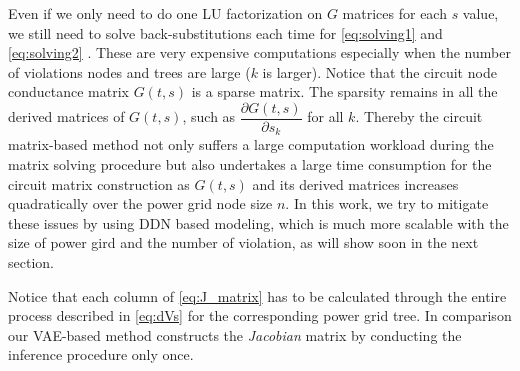 Even if we only need to do one LU factorization on $G$ matrices for each $s$ value, we still need to solve back-substitutions each time for \eqref{eq:solving1} and \eqref{eq:solving2} . These are very expensive computations especially when the number of violations nodes and trees are large ($k$ is larger).
Notice that the circuit node conductance matrix $G(t,s)$ is a sparse matrix. The sparsity remains in all the derived matrices of $G(t,s)$, such as $\dfrac{\partial G(t,s)}{\partial s_{k}}$ for all $k$.
Thereby the circuit matrix-based method not only suffers a large computation workload during the matrix solving procedure but also undertakes a large time consumption for the circuit matrix construction as $G(t,s)$ and its derived matrices increases quadratically over the power grid node size $n$. In this work, we try to mitigate these issues by using DDN based modeling, which is much more scalable with the size of power gird and the number of violation, as will show soon in the next section. 


Notice that each column of \eqref{eq:J_matrix} has to be calculated through the entire process described in \eqref{eq:dVs} for the corresponding power grid tree. In comparison our VAE-based method constructs the \textit{Jacobian} matrix by conducting the inference procedure only once.















